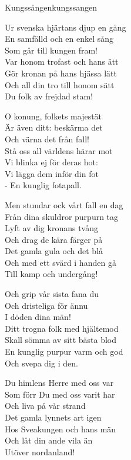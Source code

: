 \begin{song}{Kungssången}{kungssangen}
\begin{vers}
Ur svenska hjärtans djup en gång\\
En samfälld och en enkel sång\\
Som går till kungen fram!\\
Var honom trofast och hans ätt\\
Gör kronan på hans hjässa lätt\\
Och all din tro till honom sätt\\
Du folk av frejdad stam!\\
\end{vers}
\begin{vers}
O konung, folkets majestät\\
Är även ditt: beskärma det\\
Och värna det från fall!\\
Stå oss all världens härar mot\\
Vi blinka ej för deras hot:\\
Vi lägga dem inför din fot\\
- En kunglig fotapall.\\
\end{vers}
\begin{vers}
Men stundar ock vårt fall en dag\\
Från dina skuldror purpurn tag\\
Lyft av dig kronans tvång\\
Och drag de kära färger på\\
Det gamla gula och det blå\\
Och med ett svärd i handen gå\\
Till kamp och undergång!\\
\end{vers}
\begin{vers}
Och grip vår sista fana du\\
Och dristeliga för ännu\\
I döden dina män!\\
Ditt trogna folk med hjältemod\\
Skall sömma av sitt bästa blod\\
En kunglig purpur varm och god\\
Och svepa dig i den.\\
\end{vers}
\begin{vers}
Du himlens Herre med oss var\\
Som förr Du med oss varit har\\
Och liva på vår strand\\
Det gamla lynnets art igen\\
Hos Sveakungen och hans män\\
Och låt din ande vila än\\
Utöver nordanland!\\
\end{vers}
\end{song}
